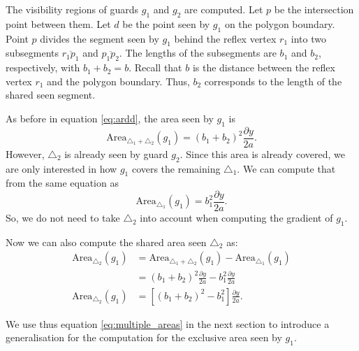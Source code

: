 The visibility regions of guards $g_1$ and $g_2$ are computed. Let $p$ be the intersection point between them. Let $d$ be the point seen by $g_1$ on the polygon boundary. Point $p$ divides the segment seen by $g_1$ behind the reflex vertex $r_1$ into two subsegments $\overline{r_1p_1}$ and $\overline{p_1p_2}$. The lengths of the subsegments are $b_1$ and $b_2$, respectively, with $b_1 + b_2 = b$. Recall that $b$ is the distance between the reflex vertex $r_1$ and the polygon boundary. Thus,  $b_2$ corresponds to the length of the shared seen segment.

As before in equation \ref{eq:ardd}, the area seen by $g_1$ is $$\text{Area}_{\triangle_1 + \triangle_2}(g_1) = (b_1 + b_2)^2\frac{\partial y}{2a}.$$
However, $\triangle_2$ is already seen by guard $g_2$. Since this area is already covered, we are only interested in how $g_1$ covers the remaining $\triangle_1$. 
We can compute that from the same equation as $$\text{Area}_{\triangle_1}(g_1) = b_1^2\frac{\partial y}{2a}.$$
So, we do not need to take $\triangle_2$ into account when computing the gradient of $g_1$. 

Now we can also compute the shared area seen $\triangle_2$ as:
\begin{align}
    \text{Area}_{\triangle_2}(g_1) &= \text{Area}_{\triangle_1 + \triangle_2}(g_1) - \text{Area}_{\triangle_1}(g_1) \nonumber \\
                              &= (b_1 + b_2)^2\frac{\partial y}{2a} - b_1^2\frac{\partial y}{2a} \nonumber \\
    \text{Area}_{\triangle_2}(g_1)&= \left[(b_1 + b_2)^2 - b_1^2\right]\frac{\partial y}{2a}. \label{eq:multiple_areas} 
\end{align}

We use thus equation \ref{eq:multiple_areas} in the next section to introduce a generalisation for the computation for the exclusive area seen by $g_1$.

